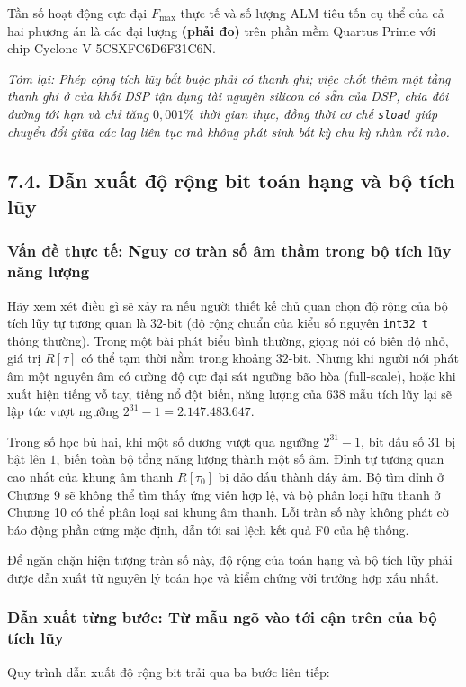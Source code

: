 Tần số hoạt động cực đại $F_{\max}$ thực tế và số lượng ALM tiêu tốn cụ thể của cả hai phương án là các đại lượng \textbf{(phải đo)} trên phần mềm Quartus Prime với chip Cyclone V 5CSXFC6D6F31C6N.

\textit{Tóm lại: Phép cộng tích lũy bắt buộc phải có thanh ghi; việc chốt thêm một tầng thanh ghi ở cửa khối DSP tận dụng tài nguyên silicon có sẵn của DSP, chia đôi đường tới hạn và chỉ tăng $0{,}001\%$ thời gian thực, đồng thời cơ chế \texttt{sload} giúp chuyển đổi giữa các lag liên tục mà không phát sinh bất kỳ chu kỳ nhàn rỗi nào.}


\subsection*{7.4. Dẫn xuất độ rộng bit toán hạng và bộ tích lũy}

\subsubsection*{Vấn đề thực tế: Nguy cơ tràn số âm thầm trong bộ tích lũy năng lượng}
Hãy xem xét điều gì sẽ xảy ra nếu người thiết kế chủ quan chọn độ rộng của bộ tích lũy tự tương quan là $32\text{-bit}$ (độ rộng chuẩn của kiểu số nguyên \texttt{int32\_t} thông thường). Trong một bài phát biểu bình thường, giọng nói có biên độ nhỏ, giá trị $R[\tau]$ có thể tạm thời nằm trong khoảng $32\text{-bit}$. Nhưng khi người nói phát âm một nguyên âm có cường độ cực đại sát ngưỡng bão hòa (full-scale), hoặc khi xuất hiện tiếng vỗ tay, tiếng nổ đột biến, năng lượng của $638\text{ mẫu}$ tích lũy lại sẽ lập tức vượt ngưỡng $2^{31}-1 = 2.147.483.647$.

Trong số học bù hai, khi một số dương vượt qua ngưỡng $2^{31}-1$, bit dấu số 31 bị bật lên $1$, biến toàn bộ tổng năng lượng thành một số âm. Đỉnh tự tương quan cao nhất của khung âm thanh $R[\tau_0]$ bị đảo dấu thành đáy âm. Bộ tìm đỉnh ở Chương 9 sẽ không thể tìm thấy ứng viên hợp lệ, và bộ phân loại hữu thanh ở Chương 10 có thể phân loại sai khung âm thanh. Lỗi tràn số này không phát cờ báo động phần cứng mặc định, dẫn tới sai lệch kết quả F0 của hệ thống.

Để ngăn chặn hiện tượng tràn số này, độ rộng của toán hạng và bộ tích lũy phải được dẫn xuất từ nguyên lý toán học và kiểm chứng với trường hợp xấu nhất.

\subsubsection*{Dẫn xuất từng bước: Từ mẫu ngõ vào tới cận trên của bộ tích lũy}
Quy trình dẫn xuất độ rộng bit trải qua ba bước liên tiếp:

